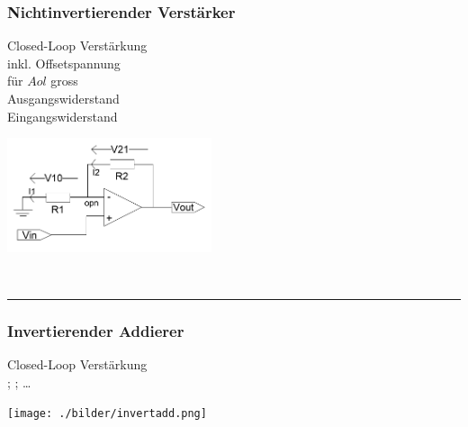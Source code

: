 		\subsubsection{Nichtinvertierender Verstärker}
			\begin{minipage}[T]{13cm}
            	
                Closed-Loop Verst\"arkung
                \hspace{3mm}\\
                inkl. Offsetspannung
                \hspace{10.2mm}\\
                f\"ur $A{ol}$ gross
                \hspace{22mm}\\
            	Ausgangswiderstand    \hspace{10.5mm}\\
            	Eingangswiderstand    \hspace{11mm}\\
            \end{minipage}
			\begin{minipage}{6cm}
            	\includegraphics[width=6cm]{./bilder/ni-verstaerker.png}
            \end{minipage}\\
\hrule

            \subsubsection{Invertierender Addierer}
            \begin{minipage}[T]{13cm}
             Closed-Loop Verst\"arkung
             \hspace{3mm}\\
             \hspace*{43mm}
             ;\hspace{0.2mm} 
             ; \ldots
            \end{minipage}
            \begin{minipage}{6cm}
                \texttt{[image: ./bilder/invertadd.png]}
            \end{minipage}\\
            

